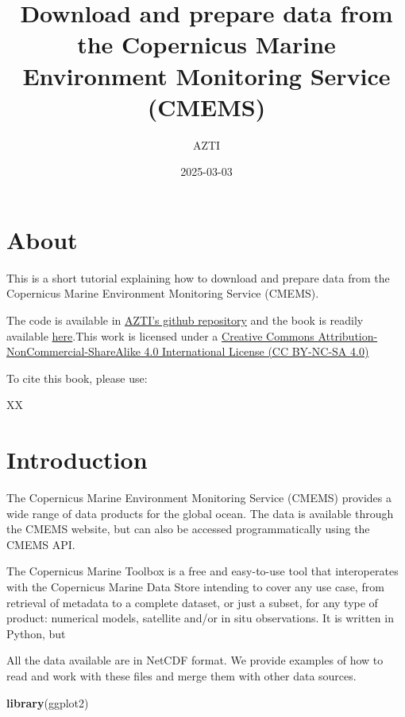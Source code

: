 \documentclass[
]{book}
\title{Download and prepare data from the Copernicus Marine Environment Monitoring Service (CMEMS)}
\author{AZTI}
\date{2025-03-03}
\newenvironment{Shaded}{\begin{snugshade}}{\end{snugshade}}
\newcommand{\FunctionTok}[1]{\textcolor[rgb]{0.13,0.29,0.53}{\textbf{#1}}}
\newcommand{\NormalTok}[1]{#1}
\begin{document}
\maketitle

{
\setcounter{tocdepth}{1}
\tableofcontents
}
\chapter*{About}\label{about}

This is a short tutorial explaining how to download and prepare data from the Copernicus Marine Environment Monitoring Service (CMEMS).

The code is available in \href{https://github.com/Fundacion-AZTI/CMEMSdata}{AZTI's github repository} and the book is readily available \href{https://fundacion-azti.github.io/CMEMSdata/}{here}.This work is licensed under a \href{https://creativecommons.org/licenses/by-nc-sa/4.0/}{Creative Commons Attribution-NonCommercial-ShareAlike 4.0 International License (CC BY-NC-SA 4.0)}

To cite this book, please use:

XX

\chapter{Introduction}\label{introduction}

The Copernicus Marine Environment Monitoring Service (CMEMS) provides a wide range of data products for the global ocean. The data is available through the CMEMS website, but can also be accessed programmatically using the CMEMS API.

The Copernicus Marine Toolbox is a free and easy-to-use tool that interoperates with the Copernicus Marine Data Store intending to cover any use case, from retrieval of metadata to a complete dataset, or just a subset, for any type of product: numerical models, satellite and/or in situ observations. It is written in Python, but

All the data available are in NetCDF format. We provide examples of how to read and work with these files and merge them with other data sources.

\begin{Shaded}
\begin{Highlighting}[]
\FunctionTok{library}\NormalTok{(ggplot2)}
\end{Highlighting}
\end{Shaded}
\end{document}
